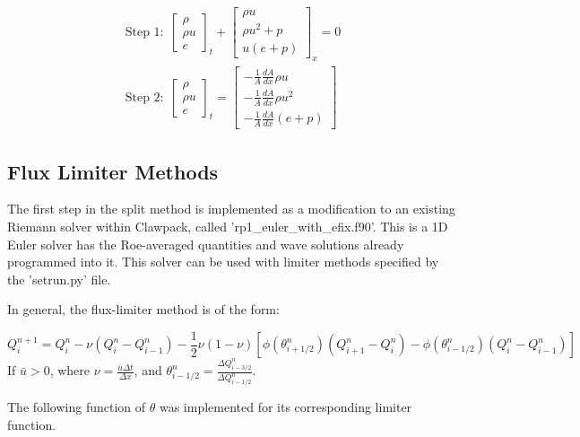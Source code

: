 \documentclass{article}%
\numberwithin{equation}{section}
\begin{document}
\begin{equation}
\begin{split}
\text{Step 1:} \ \ \left[ \begin{array}{c} \rho  \\ \rho u  \\ e \end{array} \right]_t +  \left[ \begin{array}{c} \rho u  \\ \rho u^2 + p \\ u(e + p) \end{array} \right]_x =  0 \\
\text{Step 2:} \ \ \left[ \begin{array}{c} \rho  \\ \rho u  \\ e  \end{array} \right]_t = \left[ \begin{array}{c} -\frac{1}{A}\frac{dA}{dx} \rho u \\ -\frac{1}{A} \frac{dA}{dx} \rho u^2  \\ -\frac{1}{A} \frac{dA}{dx}  (e + p)  \end{array} \right]    \end{split}
\label{eq:splitting}
\end{equation}

\subsection{Flux Limiter Methods}
The first step in the split method is implemented as a modification to an existing Riemann solver within Clawpack, called 'rp1\_euler\_with\_efix.f90'. This is a 1D Euler solver has the Roe-averaged quantities and wave solutions already programmed into it. This solver can be used with limiter methods specified by the 'setrun.py' file.

In general, the flux-limiter method is of the form:

\begin{equation}
Q^{n+1}_i=Q^n_i-\nu(Q^n_i-Q^n_{i-1})-\frac{1}{2}\nu(1-\nu)[\phi(\theta^n_{i+1/2})(Q^n_{i+1}-Q^n_i)-\phi(\theta^n_{i-1/2})(Q^n_{i}-Q^n_{i-1})]
\end{equation}
If $ \bar{u} > 0 $, where $ \nu=\frac{\bar{u}\Delta t}{\Delta x} $, and $ \theta^n_{i-1/2}=\frac{\Delta Q^n_{i-3/2}}{\Delta Q^n_{i-1/2}} $.

The following function of $ \theta $ was implemented for its corresponding limiter function.
\end{document}
